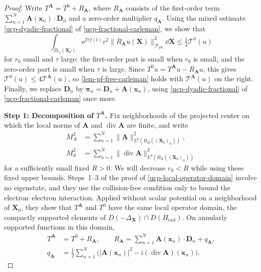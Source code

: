 \documentclass[final,reqno]{amsart}
\DeclareMathOperator{\div}{div}
\theoremstyle{remark}
\renewcommand{\i}{\mathrm{i}}
\newcommand{\e}{\mathrm{e}}
\newcommand{\DC}{D}
\newcommand{\ph}{\mathrm{ph}}
\newcommand{\rad}{\mathrm{rad}}
\newcommand{\Fock}{\mathcal{F}}
\newcommand{\vpi}{{\bm{\pi}}}
\newcommand{\vx}{\mathbf{x}}
\newcommand{\vA}{{\mathbf{A}}}
\newcommand{\vX}{{\mathbf{X}}}
\newcommand{\vD}{{\mathbf{D}}}
\begin{document}
\begin{proof}
Write $T^{\vA}=T^0+R_\vA$, where $R_\vA$ consists of the first-order
term $\sum_{n=1}^N\vA(\vx_n)\cdot\vD_n$ and a zero-order multiplier
$q_\vA$.  Using the
mixed estimate \cref{ucp-dyadic-fractional} of \cref{ucp-fractional-carleman}, we show that
\[
 \int_{B_{r_0}(\vX_0)}\e^{2\tau f(t)}r^2\|R_\vA u(\vX)\|_{\Fock_\ph}^2\dd\vX
 \leq\tfrac14\mathcal T^0(u)
\]
for $r_0$ small and $\tau$ large: the first-order part is small when
$r_0$ is small, and the zero-order part is small when $\tau$ is large.
Since $T^0u=T^{\vA}u-R_\vA u$, this gives
$\mathcal T^0(u)\leq4\mathcal T^{\vA}(u)$, so \cref{lem-pf-free-carleman}
holds with $\mathcal T^{\vA}(u)$ on the right.
Finally, we replace $\vD_n$ by $\vpi_n=\vD_n+\vA(\vx_n)$, using
\cref{ucp-dyadic-fractional} of \cref{ucp-fractional-carleman} once more.

\noindent\textbf{Step 1: Decomposition of $T^{\vA}$.}
Fix neighborhoods of the projected center on which the local norms
of $\vA$ and $\div\vA$ are finite, and write
\begin{align*}
 M_A^2&=\sum_{n=1}^N\|\vA\|_{L^6(B_R((\vX_0)_n))}^2,\\
 M_d^2&=\sum_{n=1}^N\|\div\vA\|_{L^p(B_R((\vX_0)_n))}^2
\end{align*}
for a sufficiently small fixed $R>0$.  We will decrease $r_0<R$
while using these fixed upper bounds.  Steps~1--3 of the proof of
\cref{ucp-local-operator-domain} involve no eigenstate, and they use
the collision-free condition only to bound the electron--electron
interaction.  Applied without scalar potential on a neighborhood of
$\vX_0$, they show that $T^{\vA}$ and $T^0$ have the same local
operator domain, the compactly supported elements of
$\DC(-\Delta_{\vX})\cap\DC(H_\rad)$.  On annularly supported functions
in this domain,
\begin{equation*}
 \begin{aligned}
 T^{\vA}&=T^0+R_\vA,\qquad
 R_\vA=\sum_{n=1}^N\vA(\vx_n)\cdot\vD_n+q_\vA,\\
 q_\vA&=\frac12\sum_{n=1}^N\big(|\vA(\vx_n)|^2
        -\i(\div\vA)(\vx_n)\big).
 \end{aligned}
\end{equation*}


\end{proof}
\end{document}
